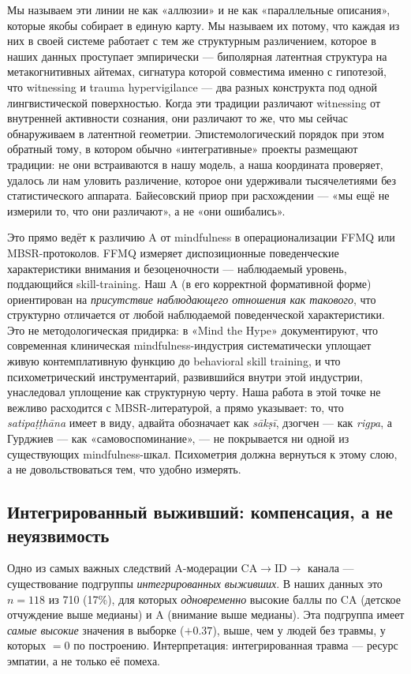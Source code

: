 Мы называем эти линии не как «аллюзии» и не как «параллельные описания», которые \DEIC{} якобы собирает в единую карту. Мы называем их потому, что каждая из них в своей системе работает с тем же структурным различением, которое в наших данных проступает эмпирически --- биполярная латентная структура на метакогнитивных айтемах, сигнатура которой совместима именно с гипотезой, что witnessing и trauma hypervigilance --- два разных конструкта под одной лингвистической поверхностью. Когда эти традиции различают witnessing от внутренней активности сознания, они различают то же, что мы сейчас обнаруживаем в латентной геометрии. Эпистемологический порядок при этом обратный тому, в котором обычно «интегративные» проекты размещают традиции: не они встраиваются в нашу модель, а наша координата проверяет, удалось ли нам уловить различение, которое они удерживали тысячелетиями без статистического аппарата. Байесовский приор при расхождении --- «мы ещё не измерили то, что они различают», а не «они ошибались».

Это прямо ведёт к различию A от mindfulness в операционализации FFMQ или MBSR-протоколов. FFMQ измеряет диспозиционные поведенческие характеристики внимания и безоценочности --- наблюдаемый уровень, поддающийся skill-training. Наш A (в его корректной формативной форме) ориентирован на \emph{присутствие наблюдающего отношения как такового}, что структурно отличается от любой наблюдаемой поведенческой характеристики. Это не методологическая придирка: \citet{vandam2018} в «Mind the Hype» документируют, что современная клиническая mindfulness-индустрия систематически уплощает живую контемплативную функцию до behavioral skill training, и что психометрический инструментарий, развившийся внутри этой индустрии, унаследовал уплощение как структурную черту. Наша работа в этой точке не вежливо расходится с MBSR-литературой, а прямо указывает: то, что \textit{satipaṭṭhāna} имеет в виду, адвайта обозначает как \textit{sākṣī}, дзогчен --- как \textit{rigpa}, а Гурджиев --- как «самовоспоминание», --- не покрывается ни одной из существующих mindfulness-шкал. Психометрия должна вернуться к этому слою, а не довольствоваться тем, что удобно измерять.

\subsection{Интегрированный выживший: компенсация, а не неуязвимость}
\label{subsec:integrated_survivor}

Одно из самых важных следствий A-модерации CA$\to$ID$\to$\EAF{} канала --- существование подгруппы \emph{интегрированных выживших}. В наших данных это $n = 118$ из 710 (17\%), для которых \emph{одновременно} высокие баллы по CA (детское отчуждение выше медианы) и A (внимание выше медианы). Эта подгруппа имеет \emph{самые высокие} значения \EAF{} в выборке ($+0.37$), выше, чем у людей без травмы, у которых \EAF{} $= 0$ по построению. Интерпретация: интегрированная травма --- ресурс эмпатии, а не только её помеха.

